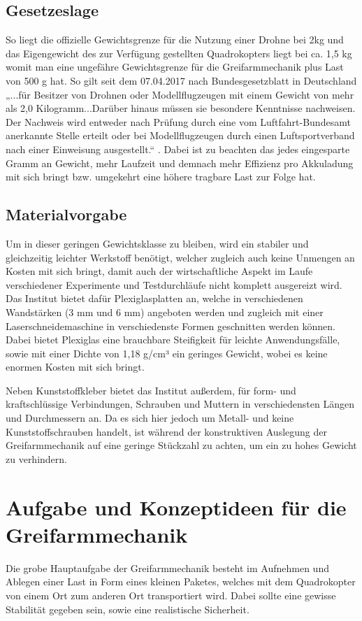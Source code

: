 \subsection{Gesetzeslage}
So liegt die offizielle Gewichtsgrenze für die Nutzung einer Drohne bei 2kg und das Eigengewicht des zur Verfügung gestellten Quadrokopters liegt bei ca. 1,5 kg womit man eine ungefähre Gewichtsgrenze für die Greifarmmechanik plus Last von 500 g hat. So gilt seit dem 07.04.2017 nach Bundesgesetzblatt in Deutschland „...für Besitzer von Drohnen oder Modellflugzeugen mit einem Gewicht von mehr als 2,0 Kilogramm...Darüber hinaus müssen sie besondere Kenntnisse nachweisen. Der Nachweis wird entweder nach Prüfung durch eine vom Luftfahrt-Bundesamt anerkannte Stelle erteilt oder bei Modellflugzeugen durch einen Luftsportverband nach einer Einweisung
ausgestellt.“ \cite{BMVI}. Dabei ist zu beachten das jedes eingesparte Gramm an Gewicht, mehr Laufzeit und demnach mehr Effizienz pro Akkuladung mit sich bringt bzw. umgekehrt eine höhere tragbare Last zur Folge hat.

\subsection{Materialvorgabe}
Um in dieser geringen Gewichtsklasse zu bleiben, wird ein stabiler und gleichzeitig leichter Werkstoff benötigt, welcher zugleich auch keine Unmengen an Kosten mit sich bringt, damit auch der wirtschaftliche Aspekt im Laufe verschiedener Experimente und Testdurchläufe nicht komplett ausgereizt wird. Das Institut bietet dafür Plexiglasplatten an, welche in verschiedenen Wandstärken (3 mm und 6 mm) angeboten werden und zugleich mit einer Laserschneidemaschine in verschiedenste Formen geschnitten werden können. Dabei bietet Plexiglas eine brauchbare Steifigkeit für leichte Anwendungsfälle, sowie mit einer Dichte von 1,18 g/cm³ \cite{Plexiglasdichte} ein geringes Gewicht, wobei es keine enormen Kosten mit sich bringt.

Neben Kunststoffkleber bietet das Institut außerdem, für form- und kraftschlüssige Verbindungen, Schrauben und Muttern in verschiedensten Längen und Durchmessern an. Da es sich hier jedoch um Metall- und keine Kunststoffschrauben handelt, ist während der konstruktiven Auslegung der Greifarmmechanik auf eine geringe Stückzahl zu achten, um ein zu hohes Gewicht zu verhindern.

\section{Aufgabe und Konzeptideen für die Greifarmmechanik}
Die grobe Hauptaufgabe der Greifarmmechanik besteht im Aufnehmen und Ablegen einer Last in Form eines kleinen Paketes, welches mit dem Quadrokopter von einem Ort zum anderen Ort transportiert wird. Dabei sollte eine gewisse Stabilität gegeben sein, sowie eine realistische Sicherheit.

